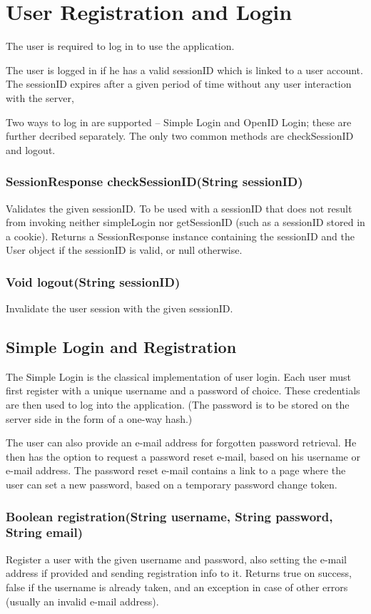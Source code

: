 \section{User Registration and Login}

The user is required to log in to use the application.

The user is logged in if he has a valid sessionID which is linked to a user account.
The sessionID expires after a given period of time without any user interaction with the server,

Two ways to log in are supported -- Simple Login and OpenID Login; these are further decribed separately. The only two common methods are checkSessionID and logout.

\subsubsection{SessionResponse checkSessionID(String sessionID)}
Validates the given sessionID. To be used with a sessionID that does not result from invoking neither simpleLogin nor getSessionID (such as a sessionID stored in a cookie).
Returns a SessionResponse instance containing the sessionID and the User object if the sessionID is valid, or null otherwise.

\subsubsection{Void logout(String sessionID)}
Invalidate the user session with the given sessionID.

\subsection{Simple Login and Registration}
\label{subsec:simple_login}

The Simple Login is the classical implementation of user login. Each user must first register with a unique username and a password of choice. These credentials are then used to log into the application. (The password is to be stored on the server side in the form of a one-way hash.)

The user can also provide an e-mail address for forgotten password retrieval. He then has the option to request a password reset e-mail, based on his username or e-mail address. The password reset e-mail contains a link to a page where the user can set a new password, based on a temporary password change token.

\subsubsection{Boolean registration(String username, String password, String email)}
Register a user with the given username and password, also setting the e-mail address if provided and sending registration info to it.
Returns true on success, false if the username is already taken, and an exception in case of other errors (usually an invalid e-mail address).

